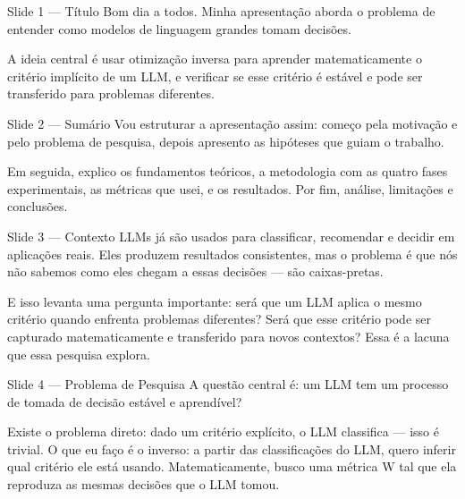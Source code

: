 \documentclass[aspectratio=169, 14pt]{beamer}
\begin{document}
\begin{frame}{Slide 1 — Título}
  Bom dia a todos. Minha apresentação aborda o problema de entender como modelos de linguagem grandes tomam decisões.

  A ideia central é usar otimização inversa para aprender matematicamente o critério implícito de um LLM, e verificar se esse critério é estável e pode ser transferido para problemas diferentes.
\end{frame}

\begin{frame}{Slide 2 — Sumário}
  Vou estruturar a apresentação assim: começo pela motivação e pelo problema de pesquisa, depois apresento as hipóteses que guiam o trabalho.

  Em seguida, explico os fundamentos teóricos, a metodologia com as quatro fases experimentais, as métricas que usei, e os resultados. Por fim, análise, limitações e conclusões.
\end{frame}

\begin{frame}{Slide 3 — Contexto}
  LLMs já são usados para classificar, recomendar e decidir em aplicações reais. Eles produzem resultados consistentes, mas o problema é que nós não sabemos como eles chegam a essas decisões — são caixas-pretas.

  E isso levanta uma pergunta importante: será que um LLM aplica o mesmo critério quando enfrenta problemas diferentes? Será que esse critério pode ser capturado matematicamente e transferido para novos contextos? Essa é a lacuna que essa pesquisa explora.
\end{frame}

\begin{frame}{Slide 4 — Problema de Pesquisa}
  A questão central é: um LLM tem um processo de tomada de decisão estável e aprendível?

  Existe o problema direto: dado um critério explícito, o LLM classifica — isso é trivial. O que eu faço é o inverso: a partir das classificações do LLM, quero inferir qual critério ele está usando. Matematicamente, busco uma métrica W tal que ela reproduza as mesmas decisões que o LLM tomou.
\end{frame}
\end{document}
